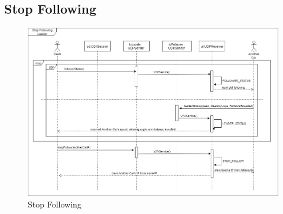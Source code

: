 \documentclass[12pt]{article}
\begin{document}
\subsection{Stop Following}
\begin{figure}[ht!]
\centering
\includegraphics[width=\linewidth]{Diagrams/StopFollowing.png}
\caption{Stop Following}
\label{fig:stopfollowing}
\end{figure}
\pagebreak
\end{document}

